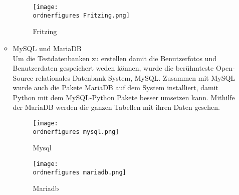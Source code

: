 \begin{enumerate}
\begin{itemize}
\begin{figure}[H]
				\texttt{[image: \\ordnerfigures Fritzing.png]}
				\centering
				\caption{Fritzing}
			\end{figure}\cite{FritzingBild}
			\item MySQL und MariaDB \\
			Um die Testdatenbanken zu erstellen damit die Benutzerfotos und Benutzerdaten gespeichert weden können, wurde die berühmteste Open-Source relationales Datenbank System, MySQL. Zusammen mit MySQL wurde auch die Pakete MariaDB auf dem System installiert, damit Python mit dem MySQL-Python Pakete besser umsetzen kann. Mithilfe der MariaDB werden die ganzen Tabellen mit ihren Daten gesehen.
			\begin{figure}[H]
				\texttt{[image: \\ordnerfigures mysql.png]}
				\centering
				\caption{Mysql}
			\end{figure}\cite{MysqlBild}
		\begin{figure}[H]
			\texttt{[image: \\ordnerfigures mariadb.png]}
			\centering
			\caption{Mariadb}


\end{figure}
\end{itemize}
\end{enumerate}
